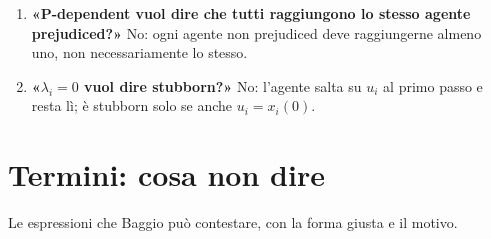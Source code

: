 \documentclass[a4paper,10pt]{article}
\begin{document}
\begin{enumerate}[leftmargin=1.6em,itemsep=3pt]
  \item \textbf{«P-dependent vuol dire che tutti raggiungono lo stesso agente prejudiced?»} No: ogni agente non prejudiced deve raggiungerne almeno uno, non necessariamente lo stesso.
  \item \textbf{«$\lambda_i=0$ vuol dire stubborn?»} No: l'agente salta su $u_i$ al primo passo e resta lì; è stubborn solo se anche $u_i=x_i(0)$.
\end{enumerate}

\section*{Termini: cosa non dire}

Le espressioni che Baggio può contestare, con la forma giusta e il motivo.
\end{document}
